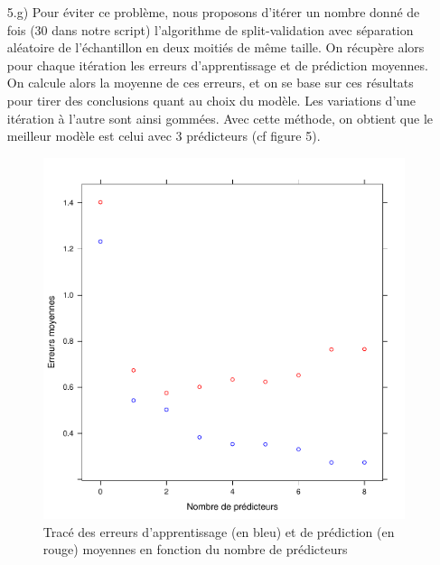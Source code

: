 \documentclass[a4paper, 12pt]{article}
\begin{document}
\begin{enumerate}
\item[5.g)] Pour éviter ce problème, nous proposons d'itérer un nombre donné de fois (30 dans notre script) l'algorithme de split-validation avec séparation aléatoire de l'échantillon en deux moitiés de même taille. On récupère alors pour chaque itération les erreurs d'apprentissage et de prédiction moyennes. On calcule alors la moyenne de ces erreurs, et on se base sur ces résultats pour tirer des conclusions quant au choix du modèle. Les variations d'une itération à l'autre sont ainsi gommées. Avec cette méthode, on obtient que le meilleur modèle est celui avec 3 prédicteurs (cf figure 5).

\begin{figure}
\begin{center}
\includegraphics[scale=1]{erreurs_moy.pdf}
\caption{Tracé des erreurs d'apprentissage (en bleu) et de prédiction (en rouge) moyennes en fonction du nombre de prédicteurs}
\end{center}
\end{figure}


\end{enumerate}
\end{document}
